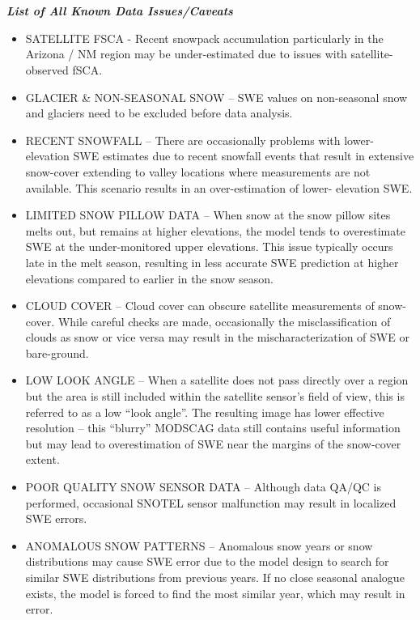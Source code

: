 \documentclass{article}
\begin{document}
\section*{}\label{sec:data_issues}\vspace{-3em}
\fontsize{12}{16}
\noindent\textbf{\textit{List of All Known Data Issues/Caveats}}
\fontsize{10}{14}
\begin{itemize}
    \item SATELLITE FSCA - Recent snowpack accumulation particularly in the Arizona / NM region may be under-estimated due to issues with satellite-observed fSCA.
    \item GLACIER \& NON-SEASONAL SNOW – SWE values on non-seasonal snow and glaciers need to be excluded before data analysis.
    \item RECENT SNOWFALL – There are occasionally problems with lower-elevation SWE estimates due to recent snowfall events that result in extensive snow-cover extending to valley locations where measurements are not available. This scenario results in an over-estimation of lower- elevation SWE.
    \item LIMITED SNOW PILLOW DATA – When snow at the snow pillow sites melts out, but remains at higher elevations, the model tends to overestimate SWE at the under-monitored upper elevations. This issue typically occurs late in the melt season, resulting in less accurate SWE prediction at higher elevations compared to earlier in the snow season. 
    \item CLOUD COVER – Cloud cover can obscure satellite measurements of snow-cover. While careful checks are made, occasionally the misclassification of clouds as snow or vice versa may result in the mischaracterization of SWE or bare-ground.
    \item LOW LOOK ANGLE – When a satellite does not pass directly over a region but the area is still included within the satellite sensor’s field of view, this is referred to as a low “look angle”. The resulting image has lower effective resolution – this “blurry” MODSCAG data still contains useful information but may lead to overestimation of SWE near the margins of the snow-cover extent.
    \item POOR QUALITY SNOW SENSOR DATA – Although data QA/QC is performed, occasional SNOTEL sensor malfunction may result in localized SWE errors.
    \item ANOMALOUS SNOW PATTERNS – Anomalous snow years or snow distributions may cause SWE error due to the model design to search for similar SWE distributions from previous years. If no close seasonal analogue exists, the model is forced to find the most similar year, which may result in error.

\end{itemize}
\end{document}
